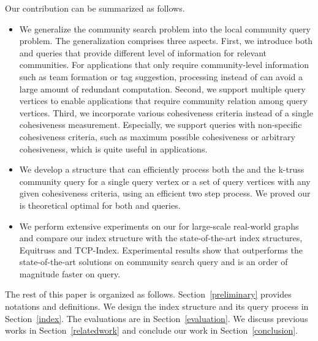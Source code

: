 Our contribution can be summarized as follows.
\begin{itemize}
	\item We generalize the community search problem into the local community query problem. The generalization comprises three aspects. First, we introduce both \toplevelprob{} and \bottomlevelprob{} queries that provide different level of information for relevant communities. For applications that only require community-level information such as team formation or tag suggestion, processing \toplevelprob{} instead of \bottomlevelprob{} can avoid a large amount of redundant computation. Second, we support multiple query vertices to enable applications that require community relation among query vertices. Third, we incorporate various cohesiveness criteria instead of a single cohesiveness measurement. Especially, we support queries with non-specific cohesiveness criteria, such as maximum possible cohesiveness or arbitrary cohesiveness, which is quite useful in applications.
	\item We develop a \twolevelindex{} structure that can efficiently process both the \toplevelprob{} and the \bottomlevelprob{} k-truss community query for a single query vertex or a set of query vertices with any given cohesiveness criteria, using an efficient two step process. We proved our \twolevelindex{} is theoretical optimal for both \toplevelprob{} and \bottomlevelprob{} queries.
	\item We perform extensive experiments on our \twolevelindex{} for large-scale real-world graphs and compare our index structure with the state-of-the-art index structures, Equitruss and TCP-Index. Experimental results show that \twolevelindex{} outperforms the state-of-the-art solutions on community search query and is an order of magnitude faster on \toplevelprob{} query.  
\end{itemize}

The rest of this paper is organized as follows. Section~\ref{preliminary} provides notations and definitions. We design the index structure and its query process in Section~\ref{index}. The evaluations are in Section~\ref{evaluation}. We discuss previous works in Section~\ref{relatedwork} and conclude our work in Section~\ref{conclusion}.

